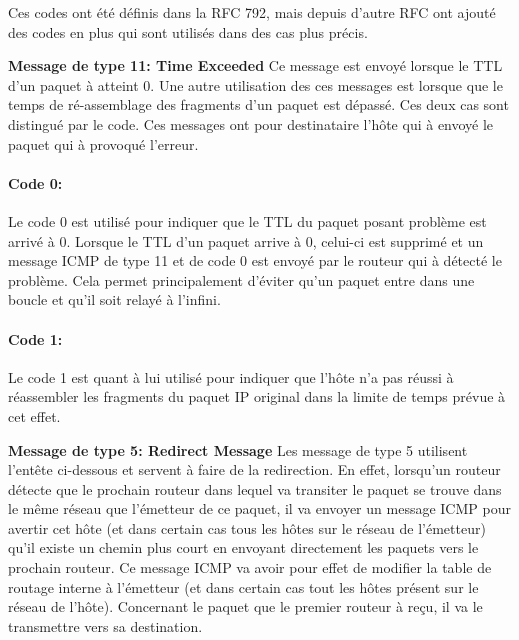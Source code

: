 Ces codes ont été définis dans la RFC 792, mais depuis d'autre RFC ont ajouté
des codes en plus qui sont utilisés dans des cas plus précis.

\vspace{1cm}
\textbf{Message de type 11: Time Exceeded}
Ce message est envoyé lorsque le TTL d'un paquet à atteint 0. Une autre
utilisation des ces messages est lorsque que le temps de ré-assemblage des
fragments d'un paquet est dépassé. Ces deux cas sont distingué par le code. Ces
messages ont pour destinataire l'hôte qui à envoyé le paquet qui à provoqué
l'erreur.%

\paragraph{Code 0:}
Le code 0 est utilisé pour indiquer que le TTL du paquet posant problème est
arrivé à 0.  Lorsque le TTL d'un paquet arrive à 0, celui-ci est supprimé et un
message ICMP de type 11 et de code 0 est envoyé par le routeur qui à détecté le
problème. Cela permet principalement d'éviter qu'un paquet entre dans une
boucle et qu'il soit relayé à l'infini.

\paragraph{Code 1:} Le code 1 est quant à lui utilisé pour indiquer que l'hôte
n'a pas réussi à réassembler les fragments du paquet IP original dans la limite
de temps prévue à cet effet.


\vspace{1cm}
\textbf{Message de type 5: Redirect Message} Les message de type 5 utilisent
l'entête ci-dessous et servent à faire de la redirection. En effet, lorsqu'un
routeur détecte que le prochain routeur dans lequel va transiter le paquet se
trouve dans le même réseau que l'émetteur de ce paquet, il va envoyer un
message ICMP pour avertir cet hôte (et dans certain cas tous les hôtes sur le
réseau de l'émetteur) qu'il existe un chemin plus court en envoyant directement
les paquets vers le prochain routeur. Ce message ICMP va avoir pour effet de
modifier la table de routage interne à l'émetteur (et dans certain cas tout les
hôtes présent sur le réseau de l'hôte). Concernant le paquet que le premier
routeur à reçu, il va le transmettre vers sa destination.


